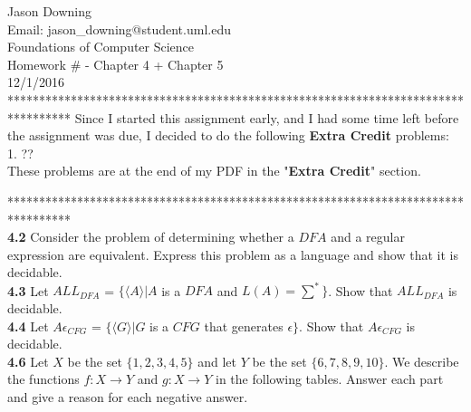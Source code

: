 \documentclass[12pt]{article}
\begin{document}
\noindent
Jason Downing \\
Email: jason\_downing@student.uml.edu \\
Foundations of Computer Science \\
Homework \# - Chapter 4 + Chapter 5 \\
12/1/2016 \\

**********************************************************************************
Since I started this assignment early, and I had some time left before the assignment
was due, I decided to do the following \textbf{Extra Credit} problems: \\

1. ?? \\

These problems are at the end of my PDF in the "\textbf{Extra Credit}" section.

********************************************************************************** \\

\pagebreak
\textbf{4.2} Consider the problem of determining whether a $DFA$ and a regular \\
expression are equivalent. Express this problem as a language and show that it is decidable. \\



\pagebreak
\textbf{4.3} Let $ALL_{DFA}$ = $\{ \langle A \rangle | A$ is a $DFA$ and $L(A) = \sum^*\}$.
Show that $ALL_{DFA}$ is decidable. \\



\pagebreak
\textbf{4.4} Let $A\epsilon_{CFG}$ = $\{ \langle G \rangle | G$ is a $CFG$ that generates $\epsilon \}$.
Show that $A\epsilon_{CFG}$ is decidable. \\



\pagebreak
\textbf{4.6} Let $X$ be the set $\{1, 2, 3, 4 ,5 \}$ and let $Y$ be the set $\{6, 7, 8, 9, 10 \}$.
We describe the functions $f: X \rightarrow Y$ and $g: X \rightarrow Y$ in the following tables.
Answer each part and give a reason for each negative answer. \\
\end{document}
